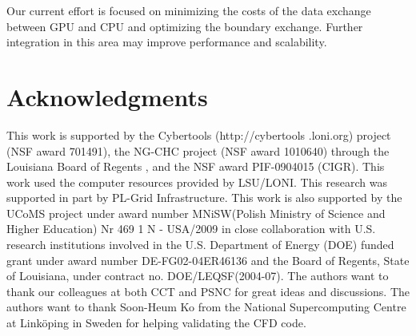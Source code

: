 \documentclass{IOS-Book-Article}
\begin{document}
Our current effort is focused on minimizing the costs of the data exchange between GPU and CPU and 
optimizing the boundary exchange. Further integration in this area may improve performance
and scalability. 

\section*{Acknowledgments}
This work is supported by the Cybertools (http://cybertools .loni.org) project 
(NSF award 701491), the NG-CHC project (NSF award 1010640) through the Louisiana Board of Regents
, and the NSF award PIF-0904015 (CIGR).
This work used the computer resources provided by LSU/LONI.
This research was supported in part by PL-Grid Infrastructure.
This work is also supported by the UCoMS project  
under award number MNiSW(Polish Ministry of Science and Higher Education) Nr 469 1 N - USA/2009 
in close collaboration with U.S. research institutions involved
in the U.S. Department of Energy (DOE) funded grant under award number DE-FG02-04ER46136 and
the Board of Regents, State of Louisiana, under contract no. DOE/LEQSF(2004-07).
The authors want to thank our colleagues at both CCT and PSNC for great ideas
and discussions. The authors want to thank Soon-Heum Ko from the National Supercomputing Centre 
at Link\"{o}ping in Sweden for helping validating the CFD code.
 


\end{document}

